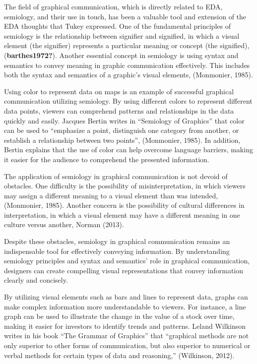 \documentclass[print]{nuthesis}
\begin{document}
The field of graphical communication, which is directly related to EDA, semiology, and their use in touch, has been a valuable tool and extension of the EDA thoughts that Tukey expressed.
One of the fundamental principles of semiology is the relationship between signifier and signified, in which a visual element (the signifier) represents a particular meaning or concept (the signified), (\textbf{barthes1972?}).
Another essential concept in semiology is using syntax and semantics to convey meaning in graphic communication effectively.
This includes both the syntax and semantics of a graphic's visual elements, (Monmonier, 1985).

Using color to represent data on maps is an example of successful graphical communication utilizing semiology.
By using different colors to represent different data points, viewers can comprehend patterns and relationships in the data quickly and easily.
Jacques Bertin writes in ``Semiology of Graphics'' that color can be used to ``emphasize a point, distinguish one category from another, or establish a relationship between two points'', (Monmonier, 1985).
In addition, Bertin explains that the use of color can help overcome language barriers, making it easier for the audience to comprehend the presented information.

The application of semiology in graphical communication is not devoid of obstacles.
One difficulty is the possibility of misinterpretation, in which viewers may assign a different meaning to a visual element than was intended, (Monmonier, 1985).
Another concern is the possibility of cultural differences in interpretation, in which a visual element may have a different meaning in one culture versus another, Norman (2013).

Despite these obstacles, semiology in graphical communication remains an indispensable tool for effectively conveying information.
By understanding semiology principles and syntax and semantics' role in graphical communication, designers can create compelling visual representations that convey information clearly and concisely.

By utilizing visual elements such as bars and lines to represent data, graphs can make complex information more understandable to viewers.
For instance, a line graph can be used to illustrate the change in the value of a stock over time, making it easier for investors to identify trends and patterns. Leland Wilkinson writes in his book ``The Grammar of Graphics'' that ``graphical methods are not only superior to other forms of communication, but also superior to numerical or verbal methods for certain types of data and reasoning,'' (Wilkinson, 2012).
\end{document}
